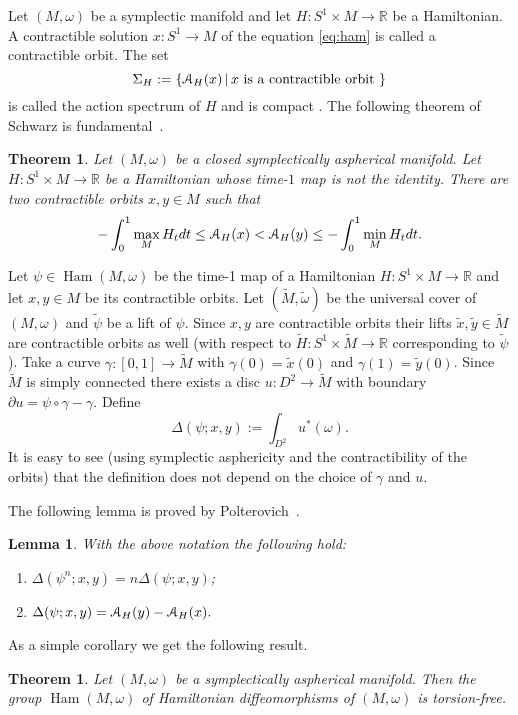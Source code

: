 \documentclass[12pt]{amsart}
\newcommand{\B}[1]{{\mathbb #1}}
\newcommand{\C}[1]{{\EuScript #1}}
\newtheorem{theorem}[subsection]{Theorem}%
\newtheorem{lemma}[subsection]{Lemma}
\numberwithin{equation}{section}
\theoremstyle{definition}
\theoremstyle{remark}
\numberwithin{figure}{section}
\numberwithin{table}{section}
\newcommand{\om}{{\omega}}
\newcommand{\ga}{{\gamma}}
\newcommand{\Si}{{\Sigma}}
\newcommand{\Mo}{(M,\omega )}
\newcommand\Ham{\operatorname{Ham}}
\begin{document}
Let $\Mo$ be a symplectic manifold and let $H:S^1\times M\to \B R$ be a  
Hamiltonian. 
A contractible solution $x:S^1\to M$ of the equation \eqref{eq:ham} 
is called a contractible orbit. The set  
$$ 
\Si_{H}:=\{\C A_H(x)\,|\, x  
\text{ is a contractible orbit }\} 
$$  
is called the action spectrum of $H$ and is compact 
\cite{HZ,S}. The following theorem of Schwarz is  fundamental~\cite{S}. 
 
\begin{theorem}\label{T:schwarz} 
Let $\Mo$ be a closed symplectically aspherical manifold. 
Let $H:S^1\times M\to \B R$ be a Hamiltonian whose time-$1$ map is not  
the identity. There are two contractible orbits $x,y\in M$ 
such that 
$$ 
-\int_0^1\max_MH_tdt\leq \C A_H(x)<\C A_H(y)\leq -\int_0^1\min_MH_tdt. 
$$ 
\end{theorem} 
 
Let $\psi \in \Ham\Mo$ be the time-1 map of a Hamiltonian 
$H:S^1\times M\to \B R$ and let $x,y\in M$ be its contractible orbits.  
Let $(\widetilde M,\widetilde \om) $ be the universal cover of $\Mo$ and 
$\widetilde \psi$ be a lift of $\psi$. Since $x,y$ are contractible 
orbits their lifts $\widetilde x,\widetilde y\in \widetilde M$ 
are contractible orbits as well (with respect to  
$\widetilde H:S^1\times \widetilde M\to \B R$ corresponding to $\widetilde  
\psi$). 
Take a curve $\ga:[0,1]\to \widetilde M$ with  
$\ga(0)=\widetilde x(0)$ and $\ga(1)=\widetilde y(0)$. 
Since $\widetilde M$ is simply connected there exists a disc  
$u:D^2\to \widetilde M$ with  boundary $\partial u = \psi\circ \ga - \ga$. 
Define 
$$ 
\Delta(\psi;x,y):= \int _{D^2}u^*(\om). 
$$ 
It is easy to see (using  symplectic asphericity and 
the contractibility of the orbits)  
that the definition does not depend on the 
choice of $\ga$ and $u$.  
 
The following lemma is proved by Polterovich~\cite{Po}. 
 
\begin{lemma} With the above notation the following hold: 
\begin{enumerate} 
\item 
$\Delta(\psi^n;x,y)=n\Delta(\psi;x,y)$; 
\item 
$\Delta (\psi;x,y)=\C A_H(y) - \C A_H(x).$ 
\end{enumerate} 
\end{lemma} 
 
As a simple corollary we get the following result. 
 
\begin{theorem} 
Let $\Mo$ be a symplectically aspherical manifold. 
Then the group $\Ham\Mo$ of Hamiltonian diffeomorphisms of $\Mo$ 
is torsion-free. 
\end{theorem} 
 
\end{document}
